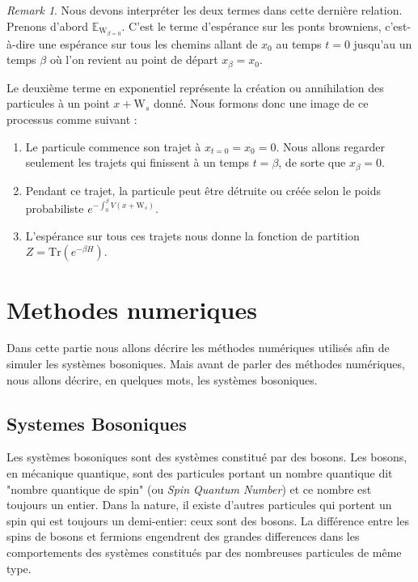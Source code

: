 \documentclass[11pt]{article}
\theoremstyle{definition}
\theoremstyle{remark}
\newtheorem*{remark}{Remark}
\begin{document}
\begin{remark}
Nous devons interpréter les deux termes dans cette dernière relation. Prenons d'abord $\mathbb{E}_{\mathrm{W}_{\beta=0}}$. C'est le terme d’espérance sur les ponts browniens, c'est-à-dire une espérance sur tous les chemins allant de $x_0$ au temps $t=0$ jusqu'au un temps $\beta$ où l'on revient au point de départ $x_{\beta}=x_0$. 

Le deuxième terme en exponentiel représente la création ou annihilation des particules à un point $x+\mathrm{W}_{s}$ donné. Nous formons donc une image de ce processus comme suivant : 

\begin{enumerate} 

\item 

Le particule commence son trajet à $x_{t=0}=x_0 = 0$. Nous allons regarder seulement les trajets qui finissent à un temps $t=\beta$, de sorte que $x_\beta = 0$.

\item 

Pendant ce trajet, la particule peut être détruite ou créée selon le poids probabiliste $e^{-\int_{0}^{\beta} V(x+\mathrm{W}_{s})}$. 

\item 

L’espérance sur tous ces trajets nous donne la fonction de partition $Z = \mathrm{Tr}(e^{-\beta H})$. 
\end{enumerate}


\end{remark}


\section{Methodes numeriques}

Dans cette partie nous allons décrire les méthodes numériques utilisés afin de simuler les systèmes bosoniques. Mais avant de parler des méthodes numériques, nous allons décrire, en quelques mots, les systèmes bosoniques. 

\subsection{Systemes Bosoniques} 

Les systèmes bosoniques sont des systèmes constitué par des bosons. Les bosons, en mécanique quantique, sont des particules portant un nombre quantique dit "nombre quantique de spin" (ou \emph{Spin Quantum Number}) et ce nombre est toujours un entier. Dans la nature, il existe d'autres particules qui portent un spin qui est toujours un demi-entier: ceux sont des bosons. La différence entre les spins de bosons et fermions engendrent des grandes differences dans les comportements des systèmes constitués par des nombreuses particules de même type. 
\end{document}
